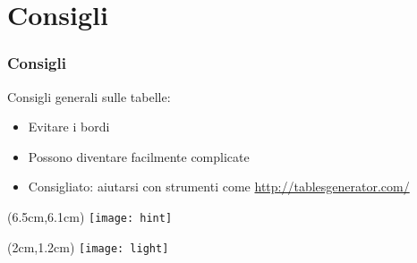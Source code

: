 \section{Consigli}
\begin{frame}
 
 \frametitle{Consigli}
 
 Consigli generali sulle tabelle:
 \begin{itemize}
  \item Evitare i bordi
  \item Possono diventare facilmente complicate
  \item Consigliato: aiutarsi con strumenti come 
\url{http://tablesgenerator.com/}
 \end{itemize}

 \begin{textblock*}{5cm}(6.5cm,6.1cm)
   \texttt{[image: hint]}
  \end{textblock*}
  
  
 \begin{textblock*}{5cm}(2cm,1.2cm)
   \texttt{[image: light]}
  \end{textblock*}
\end{frame}
